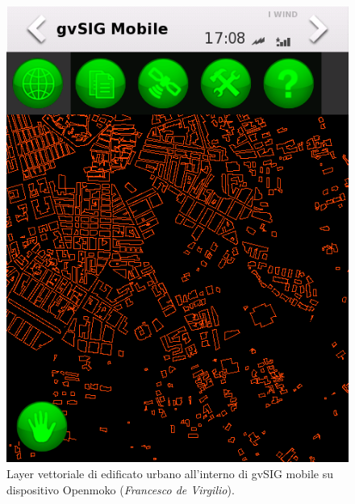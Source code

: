 \documentclass{paper}
\begin{document}
	\begin{center}
	  \begin{figure}
	    \begin{center}
	      \includegraphics[scale=0.3]{img/screenshotGV.png}
	    \end{center}
	    \caption{\small{Layer vettoriale di edificato urbano
	    all'interno di gvSIG mobile su dispositivo Openmoko (\emph{Francesco de Virgilio}).}}
	    \label{fig:Layer-gvSIG}
	  \end{figure}
	\end{center}
\end{document}
